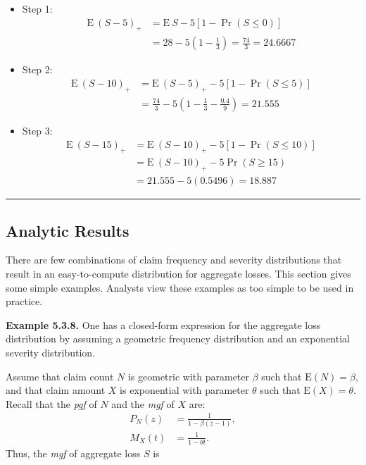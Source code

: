 \documentclass[]{book}
\theoremstyle{definition}
\theoremstyle{definition}
\theoremstyle{definition}
\theoremstyle{remark}
\begin{document}
\begin{itemize}
\item
  Step 1:\\
  \[\begin{aligned}
  \mathrm{E~}(S-5)_+ &= \mathrm{E~}S - 5 [1-\Pr(S \leq 0) ]\\ %
  &= 28 - 5 \left(1 - \frac{1}{3}\right) = \frac{74}{3}=24.6667
  \end{aligned}\]
\item
  Step 2:\\
  \[\begin{aligned}
  \mathrm{E~}(S-10)_+ &= \mathrm{E~}(S-5)_+ - 5 [1-\Pr(S \leq 5)]\\ %
  &= \frac{74}{3} - 5\left( 1 - \frac{1}{3} - \frac{0.4}{9}\right) = 21.555
  \end{aligned}\]
\item
  Step 3: \[\begin{aligned}
  \mathrm{E~}(S-15)_+ &= \mathrm{E~}(S-10)_+ - 5 [1-\Pr(S \leq 10)] \\ %
  &= \mathrm{E~}(S-10)_+ - 5\Pr (S\ge 15) \\
  &= 21.555 - 5 (0.5496) = 18.887
  \end{aligned}\]
\end{itemize}

\begin{center}\rule{0.5\linewidth}{\linethickness}\end{center}

\subsection{Analytic Results}\label{analytic-results}

There are few combinations of claim frequency and severity distributions
that result in an easy-to-compute distribution for aggregate losses.
This section gives some simple examples. Analysts view these examples as
too simple to be used in practice.

\textbf{Example 5.3.8.} One has a closed-form expression for the
aggregate loss distribution by assuming a geometric frequency
distribution and an exponential severity distribution.

Assume that claim count \(N\) is geometric with parameter \(\beta\) such
that \(\mathrm{E}(N)=\beta\), and that claim amount \(X\) is exponential
with parameter \(\theta\) such that \(\mathrm{E}(X)=\theta\). Recall
that the \emph{pgf} of \(N\) and the \emph{mgf} of \(X\) are:
\[\begin{aligned}
P_N (z) &=\frac{1}{1- \beta (z-1)},\\
M_{X}(t) &=\frac{1}{1-\theta t}.
\end{aligned}\] Thus, the \emph{mgf} of aggregate loss \(S\) is
\end{document}
